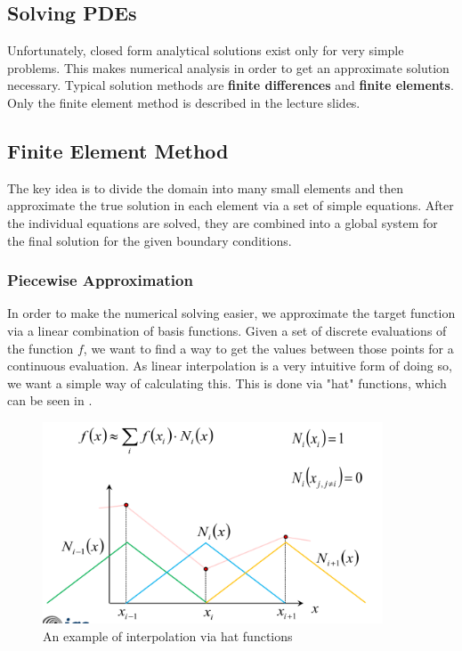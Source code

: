\documentclass{article}
\begin{document}
\subsection{Solving PDEs}
Unfortunately, closed form analytical solutions exist only for very simple problems.
This makes numerical analysis in order to get an approximate solution necessary.
Typical solution methods are \textbf{finite differences} and \textbf{finite elements}.
Only the finite element method is described in the lecture slides.

\subsection{Finite Element Method}
The key idea is to divide the domain into many small elements and then approximate the true solution in each element via a set of simple equations.
After the individual equations are solved, they are combined into a global system for the final solution for the given boundary conditions.

\subsubsection{Piecewise Approximation}
In order to make the numerical solving easier, we approximate the target function via a linear combination of basis functions.
Given a set of discrete evaluations of the function $f$, we want to find a way to get the values between those points for a continuous evaluation.
As linear interpolation is a very intuitive form of doing so, we want a simple way of calculating this.
This is done via "hat" functions, which can be seen in .

\begin{figure}[h]
    \centering
    \includegraphics[width=0.9\textwidth]{hat.png}
    \caption{An example of interpolation via hat functions}
    \label{fig:hat}
\end{figure}
\end{document}
